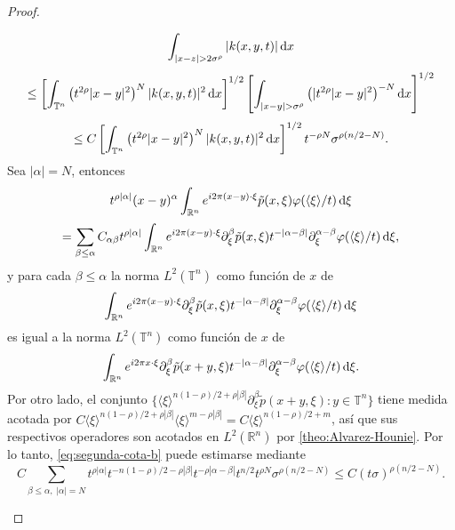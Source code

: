 \begin{proof}
\begin{itemize}
\begin{equation*}
			\int_{|x-z|>2\sigma^\rho} |k(x, y, t)| \diff x 
		\end{equation*}
		\begin{equation*}
			\leq \left[ \int_{\mathbb{T}^n} \left( t^{2\rho} |x-y|^2 \right)^N |k(x, y, t)|^2 \diff x \right]^{1/2} \left[ \int_{|x-y|>\sigma^\rho} \left(|t^{2\rho}|x-y|^2\right)^{-N}\diff x \right]^{1/2}
		\end{equation*}
		\begin{equation}
			\leq C \left[ \int_{\mathbb{T}^n} \left( t^{2\rho}|x-y|^2 \right)^N|k(x,y,t)|^2 \mathop{}\!\mathrm{d} x \right]^{1/2}t^{-\rho N}\sigma^{\rho(n/2 - N)}.
			\label{eq:segunda-cota-b}
		\end{equation} 
		Sea $|\alpha|=N$, entonces 
		\begin{equation*}
			t^{\rho|\alpha|} (x-y)^\alpha \int_{\mathbb{R}^n} e^{i2\pi(x - y) \cdot \xi} \tilde{p}(x, \xi)\varphi(\langle\xi\rangle/t)\mathop{}\!\mathrm{d}\xi 
		\end{equation*}
		\begin{equation*}
			= \sum_{\beta\leq\alpha} C_{\alpha\beta}t^{\rho|\alpha|} \int_{\mathbb{R}^n} e^{i2\pi(x - y) \cdot \xi} \partial^\beta_\xi \tilde{p}(x, \xi)t^{-|\alpha-\beta|} \partial^{\alpha-\beta}_\xi \varphi(\langle\xi\rangle/t)\mathop{}\!\mathrm{d} \xi,
		\end{equation*}
		y para cada $\beta\leq\alpha$ la norma $L^2(\mathbb{T}^n)$ como función de $x$ de 
		\begin{equation*}
			\int_{\mathbb{R}^n} e^{i2\pi(x - y) \cdot \xi} \partial^\beta_\xi \tilde{p}(x, \xi)t^{-|\alpha-\beta|} \partial^{\alpha-\beta}_\xi \varphi(\langle\xi\rangle/t)\mathop{}\!\mathrm{d} \xi
		\end{equation*}
		es igual a la norma $L^2(\mathbb{T}^n)$ como función de $x$ de 
		\begin{equation*}
			\int_{\mathbb{R}^n} e^{i2\pi x \cdot \xi} \partial^\beta_\xi \tilde{p}(x+y, \xi)t^{-|\alpha-\beta|} \partial^{\alpha-\beta}_\xi \varphi(\langle\xi\rangle/t)\mathop{}\!\mathrm{d} \xi.
		\end{equation*}
		Por otro lado, el conjunto $\{ \langle\xi\rangle^{n(1-\rho)/2 + \rho|\beta|} \partial^\beta_\xi\tilde{p}(x + y, \xi) : y \in \mathbb{T}^n  \}$ tiene medida acotada por $C\langle\xi\rangle^{n(1-\rho)/2 + \rho|\beta|} \langle\xi\rangle^{m- \rho|\beta|} = C\langle\xi\rangle^{n(1-\rho)/2 +m}   $, así que sus respectivos operadores son acotados en $L^2(\mathbb{R}^n)$ por \cref{theo:Alvarez-Hounie}. Por lo tanto, \cref{eq:segunda-cota-b} puede estimarse mediante  
		\begin{equation*}
			C\sum_{\beta\leq\alpha,\; |\alpha|=N} t^{\rho|\alpha|}t^{-n(1-\rho)/2 - \rho|\beta|}t^{-\rho|\alpha-\beta|}t^{n/2}t^{\rho N} \sigma^{\rho(n/2 - N)} \leq C(t\sigma)^{\rho (n/2 - N)}.

\end{equation*}
\end{itemize}
\end{proof}
